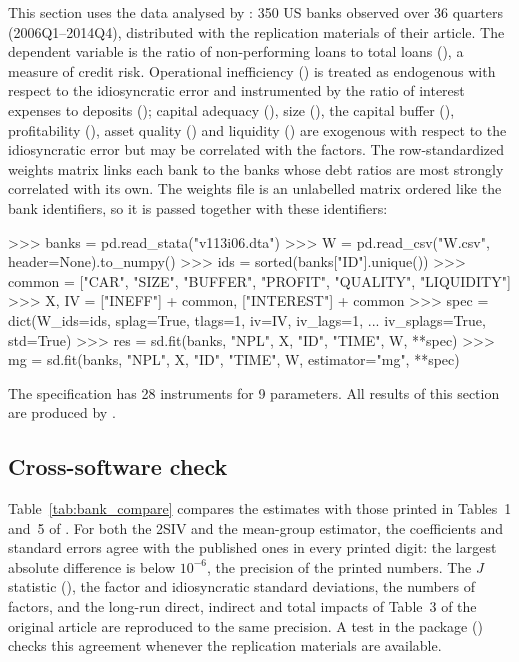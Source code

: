 

This section uses the data analysed by \citet{Kripfganz+Sarafidis:2025}: 350
US banks observed over 36 quarters (2006Q1--2014Q4), distributed with the
replication materials of their article. The dependent variable is the ratio
of non-performing loans to total loans (), a measure of credit
risk. Operational inefficiency () is treated as endogenous with
respect to the idiosyncratic error and instrumented by the ratio of interest
expenses to deposits (); capital adequacy (), size
(), the capital buffer (), profitability
(), asset quality () and liquidity
() are exogenous with respect to the idiosyncratic error but
may be correlated with the factors. The row-standardized weights matrix
links each bank to the banks whose debt ratios are most strongly correlated
with its own. The weights file is an unlabelled matrix ordered like the
bank identifiers, so it is passed together with these identifiers:

\begin{CodeInput}
>>> banks = pd.read_stata("v113i06.dta")
>>> W = pd.read_csv("W.csv", header=None).to_numpy()
>>> ids = sorted(banks["ID"].unique())
>>> common = ["CAR", "SIZE", "BUFFER", "PROFIT", "QUALITY", "LIQUIDITY"]
>>> X, IV = ["INEFF"] + common, ["INTEREST"] + common
>>> spec = dict(W_ids=ids, splag=True, tlags=1, iv=IV, iv_lags=1,
...             iv_splags=True, std=True)
>>> res = sd.fit(banks, "NPL", X, "ID", "TIME", W, **spec)
>>> mg = sd.fit(banks, "NPL", X, "ID", "TIME", W, estimator="mg", **spec)
\end{CodeInput}

The specification has 28 instruments for 9 parameters. All results of this
section are produced by .

\subsection{Cross-software check}

Table~\ref{tab:bank_compare} compares the estimates with those printed in
Tables~1 and~5 of \citet{Kripfganz+Sarafidis:2025}. For both the 2SIV and
the mean-group estimator, the coefficients and standard errors agree with
the published ones in every printed digit: the largest absolute difference
is below $10^{-6}$, the precision of the printed numbers. The $J$ statistic
(\BankJ), the factor and idiosyncratic standard deviations, the numbers of
factors, and the long-run direct, indirect and total impacts of Table~3 of
the original article are reproduced to the same precision. A test in the
package () checks this agreement
whenever the replication materials are available.

